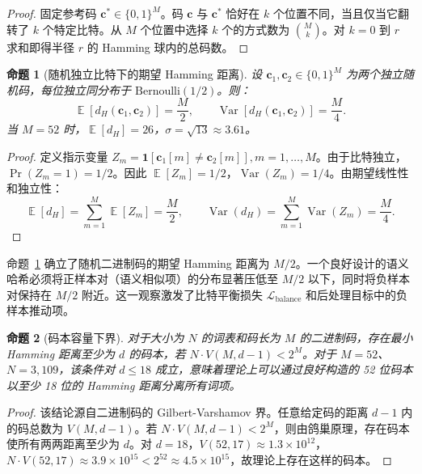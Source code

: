 \documentclass[11pt,a4paper]{article}
\newtheorem{proposition}{命题}
\DeclareMathOperator{\E}{\mathbb{E}}
\DeclareMathOperator{\Var}{Var}
\begin{document}
\begin{proof}
固定参考码 $\mathbf{c}^* \in \{0,1\}^M$。码 $\mathbf{c}$ 与 $\mathbf{c}^*$ 恰好在 $k$ 个位置不同，当且仅当它翻转了 $k$ 个特定比特。从 $M$ 个位置中选择 $k$ 个的方式数为 $\binom{M}{k}$。对 $k=0$ 到 $r$ 求和即得半径 $r$ 的 Hamming 球内的总码数。
\end{proof}

\begin{proposition}[随机独立比特下的期望 Hamming 距离]\label{prop:random-hamming-cn}
设 $\mathbf{c}_1, \mathbf{c}_2 \in \{0,1\}^M$ 为两个独立随机码，每位独立同分布于 $\text{Bernoulli}(1/2)$。则：
\begin{equation}
    \E[d_H(\mathbf{c}_1, \mathbf{c}_2)] = \frac{M}{2}, \qquad \Var[d_H(\mathbf{c}_1, \mathbf{c}_2)] = \frac{M}{4}.
\end{equation}
当 $M=52$ 时，$\E[d_H] = 26$，$\sigma = \sqrt{13} \approx 3.61$。
\end{proposition}

\begin{proof}
定义指示变量 $Z_m = \mathbf{1}[\mathbf{c}_1[m] \neq \mathbf{c}_2[m]], m=1,\dots,M$。由于比特独立，$\Pr(Z_m = 1) = 1/2$。因此 $\E[Z_m] = 1/2$，$\Var(Z_m) = 1/4$。由期望线性性和独立性：
\begin{equation}
    \E[d_H] = \sum_{m=1}^{M} \E[Z_m] = \frac{M}{2}, \qquad
    \Var(d_H) = \sum_{m=1}^{M} \Var(Z_m) = \frac{M}{4}.
\end{equation}
\end{proof}

命题~\ref{prop:random-hamming-cn} 确立了随机二进制码的期望 Hamming 距离为 $M/2$。一个良好设计的语义哈希必须将正样本对（语义相似项）的分布显著压低至 $M/2$ 以下，同时将负样本对保持在 $M/2$ 附近。这一观察激发了比特平衡损失 $\mathcal{L}_{\text{balance}}$ 和后处理目标中的负样本推动项。

\begin{proposition}[码本容量下界]\label{prop:capacity-cn}
对于大小为 $N$ 的词表和码长为 $M$ 的二进制码，存在最小 Hamming 距离至少为 $d$ 的码本，若 $N \cdot V(M, d-1) < 2^M$。对于 $M=52$、$N=3{,}109$，该条件对 $d \leq 18$ 成立，意味着理论上可以通过良好构造的 52 位码本以至少 18 位的 Hamming 距离分离所有词项。
\end{proposition}

\begin{proof}
该结论源自二进制码的 Gilbert-Varshamov 界。任意给定码的距离 $d-1$ 内的码总数为 $V(M, d-1)$。若 $N \cdot V(M, d-1) < 2^M$，则由鸽巢原理，存在码本使所有两两距离至少为 $d$。对 $d=18$，$V(52,17) \approx 1.3 \times 10^{12}$，$N \cdot V(52,17) \approx 3.9 \times 10^{15} < 2^{52} \approx 4.5 \times 10^{15}$，故理论上存在这样的码本。
\end{proof}
\end{document}
